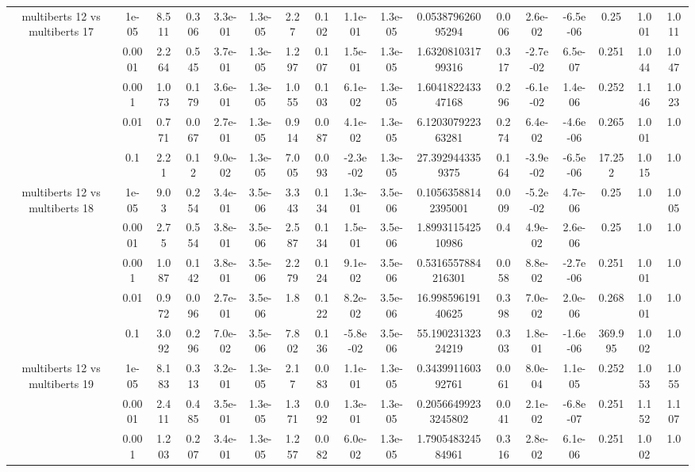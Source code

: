 \begin{tabular}{|c|c|c|c|c|c|c|c|c|c|c|c|c|c|c|c|c|}
\hline
\multirow{5}{*}{multiberts 12 vs multiberts 17} & 1e-05 & 8.511 & 0.306 & 3.3e-01 & 1.3e-05 & 2.27 & 0.102 & 1.1e-01 & 1.3e-05 & 0.053879626095294 & 0.006 & 2.6e-02 & -6.5e-06 & 0.25 & 1.001 & 1.011 \\
 & 0.0001 & 2.264 & 0.545 & 3.7e-01 & 1.3e-05 & 1.297 & 0.107 & 1.5e-01 & 1.3e-05 & 1.632081031799316 & 0.317 & -2.7e-02 & 6.5e-07 & 0.251 & 1.044 & 1.047 \\
 & 0.001 & 1.073 & 0.179 & 3.6e-01 & 1.3e-05 & 1.055 & 0.103 & 6.1e-02 & 1.3e-05 & 1.604182243347168 & 0.296 & -6.1e-02 & 1.4e-06 & 0.252 & 1.146 & 1.023 \\
 & 0.01 & 0.771 & 0.067 & 2.7e-01 & 1.3e-05 & 0.914 & 0.087 & 4.1e-02 & 1.3e-05 & 6.120307922363281 & 0.274 & 6.4e-02 & -4.6e-06 & 0.265 & 1.001 & 1.0 \\
 & 0.1 & 2.21 & 0.12 & 9.0e-02 & 1.3e-05 & 7.005 & 0.093 & -2.3e-02 & 1.3e-05 & 27.3929443359375 & 0.164 & -3.9e-02 & -6.5e-06 & 17.252 & 1.015 & 1.0 \\
\hline
\multirow{5}{*}{multiberts 12 vs multiberts 18} & 1e-05 & 9.03 & 0.254 & 3.4e-01 & 3.5e-06 & 3.343 & 0.134 & 1.3e-01 & 3.5e-06 & 0.10563588142395001 & 0.009 & -5.2e-02 & 4.7e-06 & 0.25 & 1.0 & 1.005 \\
 & 0.0001 & 2.75 & 0.554 & 3.8e-01 & 3.5e-06 & 2.587 & 0.134 & 1.5e-01 & 3.5e-06 & 1.899311542510986 & 0.4 & 4.9e-02 & 2.6e-06 & 0.25 & 1.0 & 1.0 \\
 & 0.001 & 1.087 & 0.142 & 3.8e-01 & 3.5e-06 & 2.279 & 0.124 & 9.1e-02 & 3.5e-06 & 0.5316557884216301 & 0.058 & 8.8e-02 & -2.7e-06 & 0.251 & 1.001 & 1.0 \\
 & 0.01 & 0.972 & 0.096 & 2.7e-01 & 3.5e-06 & 1.8 & 0.122 & 8.2e-02 & 3.5e-06 & 16.99859619140625 & 0.398 & 7.0e-02 & 2.0e-06 & 0.268 & 1.001 & 1.0 \\
 & 0.1 & 3.092 & 0.296 & 7.0e-02 & 3.5e-06 & 7.802 & 0.136 & -5.8e-02 & 3.5e-06 & 55.19023132324219 & 0.303 & 1.8e-01 & -1.6e-06 & 369.995 & 1.002 & 1.0 \\
\hline
\multirow{5}{*}{multiberts 12 vs multiberts 19} & 1e-05 & 8.183 & 0.313 & 3.2e-01 & 1.3e-05 & 2.17 & 0.083 & 1.1e-01 & 1.3e-05 & 0.343991160392761 & 0.061 & 8.0e-04 & 1.1e-05 & 0.252 & 1.053 & 1.055 \\
 & 0.0001 & 2.411 & 0.485 & 3.5e-01 & 1.3e-05 & 1.371 & 0.092 & 1.3e-01 & 1.3e-05 & 0.20566499233245802 & 0.041 & 2.1e-02 & -6.8e-07 & 0.251 & 1.152 & 1.107 \\
 & 0.001 & 1.203 & 0.207 & 3.4e-01 & 1.3e-05 & 1.257 & 0.082 & 6.0e-02 & 1.3e-05 & 1.790548324584961 & 0.316 & 2.8e-02 & 6.1e-06 & 0.251 & 1.002 & 1.0 \\

\end{tabular}
